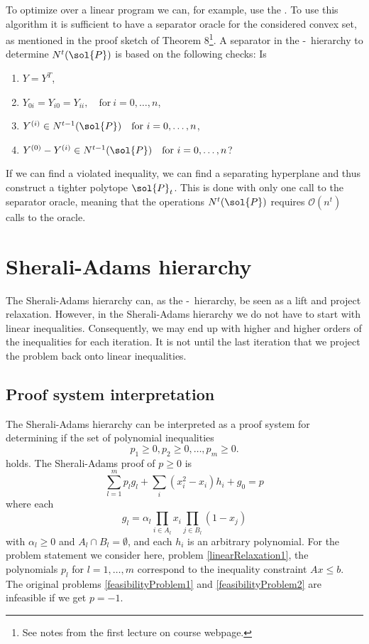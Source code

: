 \documentclass[a4paper,twoside,justified]{tufte-handout}
\begin{document}
To optimize over a linear program we can, for example, use the . To use this algorithm it is sufficient to have a separator oracle for the considered convex set, as mentioned in the proof sketch of Theorem 8\footnote{See notes from the first lecture on course webpage.}. A separator in the \Lovasz-\Schrijver\ hierarchy to determine $N^t(\sol{P})$ is based on the following checks: Is
\begin{enumerate}
\item $Y=Y^T$,
\item $Y_{0i}=Y_{i0}=Y_{ii}, \quad\text{for}\ i=0,\ldots,n$,
\item $Y^{(i)}\in N^{t-1}(\sol{P}) \quad\text{for}\ i=0,\ldots,n$,
\item $Y^{(0)}-Y^{(i)}\in N^{t-1}(\sol{P}) \quad\text{for}\ i=0,\ldots,n$?
\end{enumerate}
If we can find a violated inequality, we can find a separating hyperplane and thus construct a tighter polytope $\sol{P}_t$. This is done with only one call to the separator oracle, meaning that the operations $N^t(\sol{P})$ requires $\mathcal{O}(n^t)$ calls to the oracle. 

\section{Sherali-Adams hierarchy}
The Sherali-Adams hierarchy can, as the \Lovasz-\Schrijver\ hierarchy, be seen as a lift and project relaxation. However, in the Sherali-Adams hierarchy we do not have to start with linear inequalities. Consequently, we may end up with higher and higher orders of the inequalities for each iteration. It is not until the last iteration that we project the problem back onto linear inequalities. 

\subsection{Proof system interpretation}
The Sherali-Adams hierarchy can be interpreted as a proof system for determining if the set of polynomial inequalities 
\begin{equation}
  p_{1}\geq 0 , p_{2}\geq 0, \ldots , p_{m} \geq 0. 
\end{equation}
holds. The Sherali-Adams proof of $p\geq 0$ is
\begin{equation}
 \sum_{l=1}^m p_{l} g_{l} + \sum_{i} (x^{2}_{i} -x_{i}) h_{i}
 + g_{0}= p
\end{equation}
where each 
\begin{equation}
  g_{l} = \alpha_{l} \prod_{i\in A_{l}} x_{i} \prod_{j \in
    B_{l}}(1-x_{j})  
\end{equation}
with $ \alpha_{l}\geq 0 $ and $ A_{l} \cap B_{l}=\emptyset $, and each $ h_{i} $ is an arbitrary polynomial. For the problem statement we consider here, problem \eqref{linearRelaxation1}, the polynomials $p_l$ for $l=1,\ldots,m$ correspond to the inequality constraint $Ax\leq b$. The original problems \eqref{feasibilityProblem1} and \eqref{feasibilityProblem2} are infeasible if we get $p=-1$.
\end{document}
